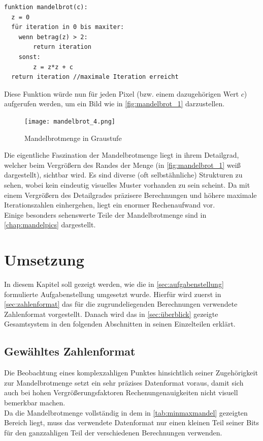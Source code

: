 \documentclass[a4paper,12pt,onesided]{report}
\begin{document}
\begin{lstlisting}[label=lst:mandelbrotpseudo,caption=Algorithmus zur Berechnung der Iterationszahl eines $c$]
funktion mandelbrot(c):
  z = 0
  für iteration in 0 bis maxiter:
 	wenn betrag(z) > 2:
 		return iteration
 	sonst:	
		z = z*z + c
  return iteration //maximale Iteration erreicht
\end{lstlisting}

Diese Funktion würde nun für jeden Pixel (bzw. einem dazugehörigen Wert $c$) aufgerufen werden, um ein Bild wie in \autoref{fig:mandelbrot_1} darzustellen.

\begin{figure}[H]
	\centering
	\texttt{[image: mandelbrot\_4.png]}
	\caption{Mandelbrotmenge in Graustufe}
	\label{fig:mandelbrot_1}
\end{figure}

Die eigentliche Faszination der Mandelbrotmenge liegt in ihrem Detailgrad, welcher beim Vergrößern des Randes der Menge (in \autoref{fig:mandelbrot_1} weiß dargestellt), sichtbar wird. Es sind diverse (oft selbstähnliche) Strukturen zu sehen, wobei kein eindeutig visuelles Muster vorhanden zu sein scheint. Da mit einem Vergrößern des Detailgrades präzisere Berechnungen und höhere maximale Iterationszahlen einhergehen, liegt ein enormer Rechenaufwand vor.\\
Einige besonders sehenswerte Teile der Mandelbrotmenge sind in \autoref{chap:mandelpics}
dargestellt.

\chapter{Umsetzung}
In diesem Kapitel soll gezeigt werden, wie die in \autoref{sec:aufgabenstellung} formulierte Aufgabenstellung umgesetzt wurde. Hierfür wird zuerst in \autoref{sec:zahlenformat} das für die zugrundeliegenden Berechnungen verwendete Zahlenformat vorgestellt. Danach wird das in \autoref{sec:überblick} gezeigte Gesamtsystem in den folgenden Abschnitten in seinen Einzelteilen erklärt.

\section{Gewähltes Zahlenformat}
\label{sec:zahlenformat}
Die Beobachtung eines komplexzahligen Punktes hinsichtlich seiner Zugehörigkeit zur Mandelbrotmenge setzt ein sehr präzises Datenformat voraus, damit sich auch bei hohen Vergrößerungsfaktoren Rechenungenauigkeiten nicht visuell bemerkbar machen.\\
Da die Mandelbrotmenge vollständig in dem in \autoref{tab:minmaxmandel} gezeigten Bereich liegt, muss das verwendete Datenformat nur einen kleinen Teil seiner Bits für den ganzzahligen Teil der verschiedenen Berechnungen verwenden. \\
\end{document}
